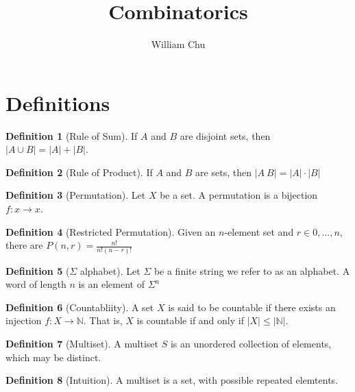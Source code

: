 \documentclass{article}
\theoremstyle{definition}
\newtheorem{definition}{Definition}[section]
\begin{document}
 

\title{Combinatorics} 
\author{William Chu} 
\maketitle 

\section{Definitions}

\begin{definition}[Rule of Sum]
\label {ruleOfSum}
If $A$ and $B$ are disjoint sets, then $|A \cup B| = |A| +|B|$.
\end{definition}

\begin{definition}[Rule of Product]
\label {ruleOfProduct}
If $A$ and $B$ are sets, then $|A\ B|=|A| \cdot |B|$
\end{definition}

\begin{definition}[Permutation]
\label {permutation}
Let $X$ be a set. A permutation is a bijection $f: x \rightarrow x$.
\end{definition}

\begin{definition}[Restricted Permutation]
\label {restrictedPermutation}
Given an $n$-element set and $r \in {0,...,n}$, there are $P(n,r)= \frac{n!}{n!(n-r)!}$
\end{definition}

\begin{definition}[$\Sigma$ alphabet]
\label {sigmaAlphabet}
Let $\Sigma$ be a finite string we refer to as an alphabet. A word of length $n$ is an element of $\Sigma ^n$
\end{definition}

\begin{definition}[Countabliity]
\label {countability}
A set $X$ is said to be countable if there exists an injection $f: X \rightarrow \mathbb{N}$. That is, $X$ is countable if and only if $|X| \leq |\mathbb{N}|$.
\end{definition}

\begin{definition}[Multiset]
\label {multiset}
A multiset $S$ is an unordered collection of elements, which may be distinct.
\end{definition}

\begin{definition}[Intuition]
\label {intuition}
A multiset is a set, with possible repeated elemtents.
\end{definition}
\end{document}
